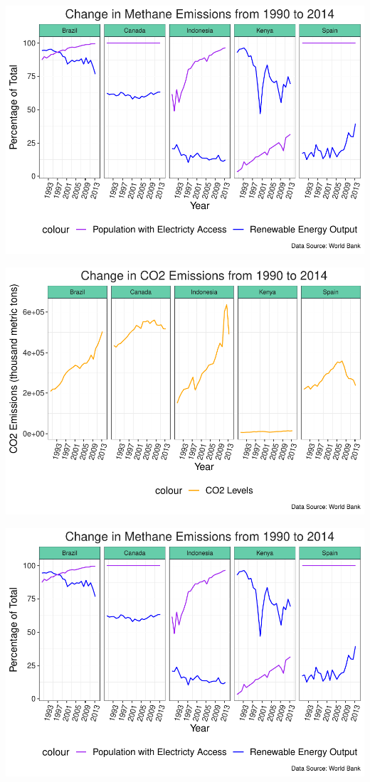 \documentclass[12pt,]{article}
\begin{document}
\includegraphics{Marx_ENV872_Project_files/figure-latex/unnamed-chunk-9-1.pdf}

\includegraphics{Marx_ENV872_Project_files/figure-latex/unnamed-chunk-10-1.pdf}

\includegraphics{Marx_ENV872_Project_files/figure-latex/unnamed-chunk-11-1.pdf}
\end{document}
